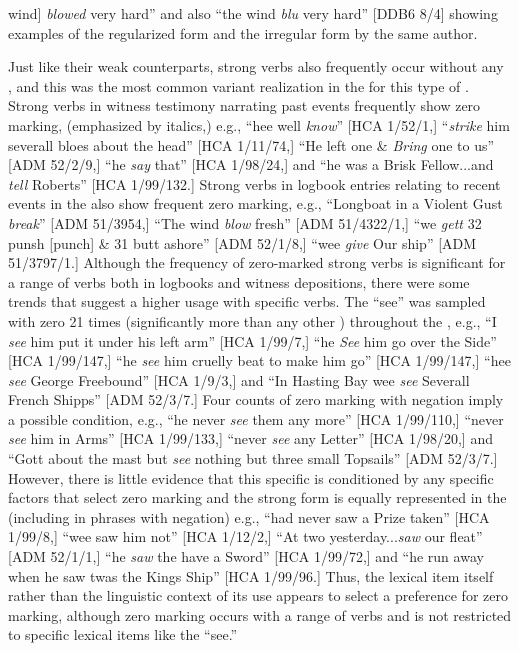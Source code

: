 wind] \textit{blowed} very hard” and also “the wind \textit{blu} very hard” [DDB6 8/4] showing examples of the regularized  form and the irregular form by the same author. 

Just like their weak counterparts, strong verbs also frequently occur without any , and this was the most common variant realization in the  for this type of . Strong verbs in witness testimony narrating past events frequently show zero marking, (emphasized by italics,) e.g., “hee well \textit{know}” [HCA 1/52/1,] “\textit{strike} him severall bloes about the head” [HCA 1/11/74,] “He left one \&  \textit{Bring} one to us” [ADM 52/2/9,] “he \textit{say} that” [HCA 1/98/24,] and “he was a Brisk Fellow...and \textit{tell} Roberts” [HCA 1/99/132.] Strong verbs in logbook entries relating to recent events in the  also show frequent zero marking, e.g., “Longboat in a Violent Gust \textit{break}” [ADM 51/3954,] “The wind \textit{blow} fresh” [ADM 51/4322/1,] “we \textit{gett} 32 punsh [punch] \& 31 butt ashore” [ADM 52/1/8,] “wee \textit{give} Our ship” [ADM 51/3797/1.] Although the frequency of zero-marked  strong verbs is significant for a range of verbs both in logbooks and witness depositions, there were some trends that suggest a higher usage with specific verbs. The  “see” was sampled with zero  21 times (significantly more than any other ) throughout the , e.g., “I \textit{see} him put it under his left arm” [HCA 1/99/7,] “he \textit{See} him go over the Side” [HCA 1/99/147,] “he \textit{see} him cruelly beat to make him go” [HCA 1/99/147,] “hee \textit{see} George Freebound” [HCA 1/9/3,] and “In Hasting Bay wee \textit{see} Severall French Shipps” [ADM 52/3/7.] Four counts of zero marking with negation imply a possible condition, e.g., “he never \textit{see} them any more” [HCA 1/99/110,] “never \textit{see} him in Arms” [HCA 1/99/133,] “never \textit{see} any Letter” [HCA 1/98/20,] and “Gott about the mast but \textit{see} nothing but three small Topsails” [ADM 52/3/7.] However, there is little evidence that this specific  is conditioned by any specific factors that select zero  marking and the strong  form is equally represented in the  (including in phrases with negation) e.g., “had never saw a Prize taken” [HCA 1/99/8,] “wee saw him not” [HCA 1/12/2,] “At two yesterday...\textit{saw} our fleat” [ADM 52/1/1,] “he \textit{saw} the  have a Sword” [HCA 1/99/72,] and “he run away when he saw twas the Kings Ship” [HCA 1/99/96.] Thus, the lexical item itself rather than the linguistic context of its use appears to select a preference for zero marking, although zero marking occurs with a range of verbs and is not restricted to specific lexical items like the  “see.”

